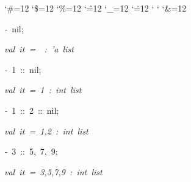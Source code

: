 \begin{list}{}
{\setlength{\leftmargin}{\leftmargini}
\setlength{\rightmargin}{0cm}
\setlength{\itemindent}{0cm}
\setlength{\listparindent}{0cm}
\setlength{\itemsep}{0cm}
\setlength{\parsep}{0cm}
\setlength{\labelsep}{0cm}
\setlength{\labelwidth}{0cm}
\catcode`\#=12
\catcode`\$=12
\catcode`\%=12
\catcode`\^=12
\catcode`\_=12
\catcode`\.=12
\catcode`
\catcode`
\catcode`\&=12
\ttfamily}
\small
\item[]\textsl{-\ }nil;
\item[]\textsl{val\ it\ =\ \ :\ 'a\ list}
\item[]\textsl{-\ }1\ ::\ nil;
\item[]\textsl{val\ it\ =\ 1\ :\ int\ list}
\item[]\textsl{-\ }1\ ::\ 2\ ::\ nil;
\item[]\textsl{val\ it\ =\ 1,2\ :\ int\ list}
\item[]\textsl{-\ }3\ ::\ 5,\ 7,\ 9;
\item[]\textsl{val\ it\ =\ 3,5,7,9\ :\ int\ list}
\end{list}
